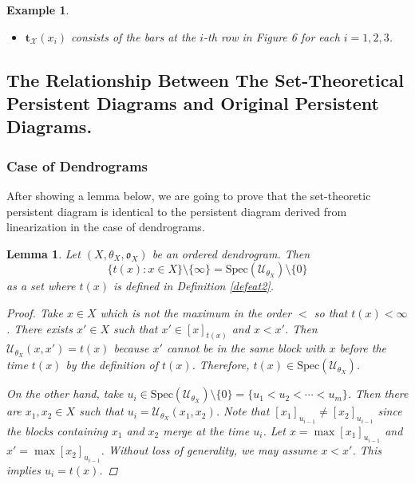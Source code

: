 \documentclass[a4paper,12pt]{article}
\newtheorem{lemma}{Lemma}[section]
\newtheorem{example}{Example}[section]
\begin{document}
\begin{example}
\begin{itemize}
\item $\mathbf{t}_{\mathcal{X}}(x_i)$ consists of the bars at the $i$-th row in Figure 6 for each $i=1,2,3$.
\end{itemize}

\end{example}

\subsection{The Relationship Between The Set-Theoretical Persistent Diagrams and Original Persistent Diagrams.} 

\subsubsection{Case of Dendrograms}

 After showing a lemma below, we are going to prove that the set-theoretic persistent diagram is identical to the persistent diagram derived from linearization in the case of dendrograms.
\begin{lemma} Let $(X,\theta_X, \mathfrak{o}_X)$ be an ordered dendrogram. Then $$\{t(x):x \in X\}\setminus \{\infty\}=\mathrm{Spec}(\mathcal{U}_{\theta_X})\setminus \{0\}$$ as a set where $t(x)$ is defined in Definition \ref{defeat2}.

\begin{proof}
Take $x\in X$ which is not the maximum in the order $<$ so that $t(x)<\infty$.  There exists $x'\in X$ such that $x'\in [x]_{t(x)}$ and $x<x'$. Then $\mathcal{U}_{\theta_X}(x,x')=t(x)$ because $x'$ cannot be in the same block with $x$ before the time $t(x)$ by the definition of $t(x)$. Therefore, $t(x)\in \mathrm{Spec}(\mathcal{U}_{\theta_X})$.\par 
On the other hand, take $u_i\in \mathrm{Spec}(\mathcal{U}_{\theta_X})\setminus \{0\}=\{u_1< u_2<\cdots< u_m\}$. Then there are $x_1,x_2\in X$ such that $u_i=\mathcal{U}_{\theta_X}(x_1,x_2)$. Note that $[x_1]_{u_{i-1}}\neq [x_2]_{u_{i-1}}$ since the blocks containing $x_1$ and $x_2$ merge at the time $u_i$. Let $x=\max[x_1]_{u_{i-1}}$ and $x'=\max[x_2]_{u_{i-1}}$. Without loss of generality, we may assume $x<x'$. This implies $u_i=t(x)$.\end{proof}

\end{lemma}
\end{document}
